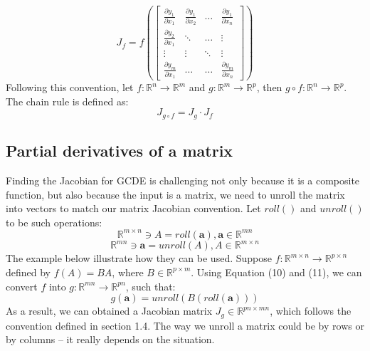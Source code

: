 \documentclass{article}
\begin{document}
\begin{equation}
J_{f} = f(
\begin{bmatrix}
    \frac{\partial y_{1}}{\partial x_{1}} & \frac{\partial y_{1}}{\partial x_{2}} &\hdots & \frac{\partial y_{1}}{\partial x_{n}} \\
    \frac{\partial y_{2}}{\partial x_{1}}  & \ddots &\hdots & \vdots \\
    \vdots & \vdots & \ddots & \vdots\\
    \frac{\partial y_{m}}{\partial x_{1}}  & \hdots & \hdots & \frac{\partial y_{m}}{\partial x_{n}} 
\end{bmatrix}
)
\end{equation}
Following this convention, let $f: \mathbb{R}^{n} \rightarrow \mathbb{R}^{m}$ and $g: \mathbb{R}^{m} \rightarrow \mathbb{R}^{p}$, then $g \circ f: \mathbb{R}^{n} \rightarrow \mathbb{R}^{p}$. The chain rule is defined as: 
\begin{equation}
    J_{g \circ f} = J_{g}\cdot J_{f}
\end{equation}

\subsection{Partial derivatives of a matrix}
Finding the Jacobian for GCDE is challenging not only because it is a composite function, but also because the input is a matrix, we need to unroll the matrix into vectors to match our matrix Jacobian convention. Let $roll()$ and $unroll()$ to be such operations:
\begin{equation}
    \mathbb{R}^{m\times n}\ni A = roll(\mathbf{a}), \mathbf{a}\in\mathbb{R}^{mn}
\end{equation}
\begin{equation}
    \mathbb{R}^{mn}\ni\mathbf{a} = unroll(A),  A\in\mathbb{R}^{m\times n}
\end{equation}
The example below illustrate how they can be used. Suppose $f: \mathbb{R}^{m\times n} \rightarrow \mathbb{R}^{p\times n}$ defined by $f(A) = BA$, where $B \in \mathbb{R}^{p\times m}$. Using Equation (10) and (11), we can convert $f$ into $g: \mathbb{R}^{mn}\rightarrow \mathbb{R}^{pn}$, such that:
\begin{equation}
    g(\mathbf{a}) = unroll(B(roll(\mathbf{a})))
\end{equation}
As a result, we can obtained a Jacobian matrix $J_{g} \in \mathbb{R}^{pn\times mn}$, which follows the convention defined in section 1.4. The way we unroll a matrix could be by rows or by columns -- it really depends on the situation.
\end{document}
